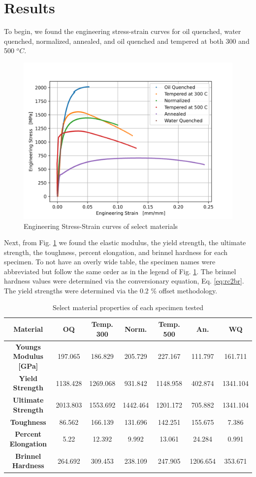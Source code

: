 \documentclass{article}
\begin{document}
\newpage
\section{Results}
To begin, we found the engineering stress-strain curves for oil quenched, water quenched, normalized, annealed, and oil quenched and tempered at both 300 and 500 $^oC$. 

\begin{figure}[!h!]
    \centering
    \includegraphics[width=0.5\linewidth]{Lab5/plots/q1_adjusted.png}
    \caption{Engineering Stress-Strain curves of select materials}
    \label{fig:q1-all}
\end{figure}

Next, from Fig. \ref{fig:q1-all} we found the elastic modulus, the yield strength, the ultimate strength, the toughness, percent elongation, and brinnel hardness for each specimen. To not have an overly wide table, the specimen names were abbreviated but follow the same order as in the legend of Fig. \ref{fig:q1-all}. The brinnel hardness values were determined via the conversionary equation, Eq. \ref{eq:rc2br}. The yield strengths were determined via the 0.2 \% offset methodology.

\begin{table}[!h!]
    \centering
    \renewcommand{\arraystretch}{1.5}
    \caption{Select material properties of each specimen tested}
    \begin{tabular}{|c|c|c|c|c|c|c|}
        \toprule
        \textbf{Material} & \textbf{OQ} & \textbf{Temp. 300} & \textbf{Norm.} & \textbf{Temp. 500} & \textbf{An.} & \textbf{WQ} \\ 
        \midrule
        \hline 
        \textbf{Youngs Modulus [GPa]} & 197.065 & 186.829 & 205.729 & 227.167 & 111.797 & 161.711 \\ 
        \hline 
        \textbf{Yield Strength} & 1138.428 & 1269.068 & 931.842 & 1148.958 & 402.874 & 1341.104 \\ 
        \hline 
        \textbf{Ultimate Strength} & 2013.803 & 1553.692 & 1442.464 & 1201.172 & 705.882 & 1341.104 \\ 
        \hline 
        \textbf{Toughness} & 86.562 & 166.139 & 131.696 & 142.251 & 155.675 & 7.386 \\ 
        \hline 
        \textbf{Percent Elongation} & 5.22 & 12.392 & 9.992 & 13.061 & 24.284 & 0.991 \\ 
        \hline 
        \textbf{Brinnel Hardness} & 264.692 & 309.453 & 238.109 & 247.905 & 1206.654 & 353.671 \\ 
        \hline 
    \end{tabular}
    \label{tab:q2}
\end{table}
\end{document}
